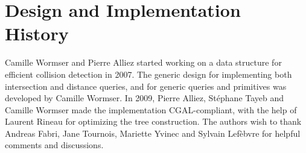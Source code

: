 \section{Design and Implementation History}
\label{AABB_tree_section_history}

Camille Wormser and Pierre Alliez started working on a data structure for efficient collision detection in 2007. The generic design for implementing both intersection and distance queries, and for generic queries and primitives was developed by Camille Wormser. In 2009, Pierre Alliez, St\'ephane Tayeb and Camille Wormser made the implementation CGAL-compliant, with the help of Laurent Rineau for optimizing the tree construction. The authors wish to thank Andreas Fabri, Jane Tournois, Mariette Yvinec and Sylvain Lef\`ebvre for helpful comments and discussions.

